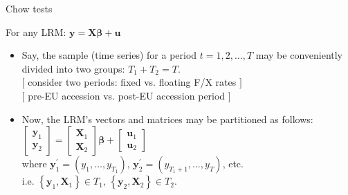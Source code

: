 \documentclass{beamer}
\begin{document}


\begin{frame}{Chow tests}

For any LRM: $\bm{y} = \bm{X\beta}+\bm{u}$
\vspace{0.3cm}

\begin{itemize}

\item Say, the sample (time series) for a period $t=1,2, \dots, T$ may be conveniently divided into two groups: $T_1 + T_2 = T$.  \\ 
$[$ consider two periods: fixed vs. floating F/X rates $]$ \\ 
$[$ pre-EU accession vs. post-EU accession period $]$
\vspace{0.3cm}
\item Now, the LRM's vectors and matrices may be partitioned as follows: \\
\vspace{0.3cm}
$ \begin{bmatrix} \bm{y}_1 \\ \bm{y}_2 \end{bmatrix} = 
\begin{bmatrix} \bm{X}_1 \\ \bm{X}_2 \end{bmatrix} \bm{\beta} +
\begin{bmatrix} \bm{u}_1 \\ \bm{u}_2 \end{bmatrix}$ \\
\vspace{0.2cm}
where $\bm{y}_1^\prime = (y_1, \dots , y_{T_1})$, 
$\bm{y}_2^\prime = (y_{T_1+1}, \dots , y_{T})$, etc. 
\\ i.e. $\left\lbrace\bm{y}_1, \bm{X}_1 \right\rbrace \in T_1$,  
$\left\lbrace\bm{y}_2, \bm{X}_2 \right\rbrace \in T_2$. 

\end{itemize}

\end{frame}



\end{document}
